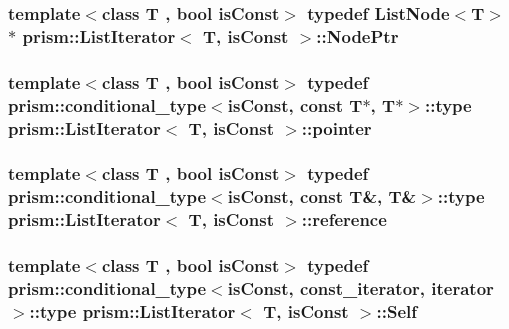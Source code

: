 \subsubsection[{\texorpdfstring{Node\+Ptr}{NodePtr}}]{\setlength{\rightskip}{0pt plus 5cm}template$<$class T , bool is\+Const$>$ typedef {\bf List\+Node}$<$T$>$$\ast$ {\bf prism\+::\+List\+Iterator}$<$ T, is\+Const $>$\+::{\bf Node\+Ptr}}\hypertarget{structprism_1_1_list_iterator_aad2175a44d3db4fd84059ae15158b174}{}\label{structprism_1_1_list_iterator_aad2175a44d3db4fd84059ae15158b174}
\subsubsection[{\texorpdfstring{pointer}{pointer}}]{\setlength{\rightskip}{0pt plus 5cm}template$<$class T , bool is\+Const$>$ typedef {\bf prism\+::conditional\+\_\+type}$<$is\+Const, const T$\ast$, T$\ast$$>$\+::type {\bf prism\+::\+List\+Iterator}$<$ T, is\+Const $>$\+::{\bf pointer}}\hypertarget{structprism_1_1_list_iterator_adb94db3cc26f2df6b6962b756b6fa3c3}{}\label{structprism_1_1_list_iterator_adb94db3cc26f2df6b6962b756b6fa3c3}
\subsubsection[{\texorpdfstring{reference}{reference}}]{\setlength{\rightskip}{0pt plus 5cm}template$<$class T , bool is\+Const$>$ typedef {\bf prism\+::conditional\+\_\+type}$<$is\+Const, const T\&, T\&$>$\+::type {\bf prism\+::\+List\+Iterator}$<$ T, is\+Const $>$\+::{\bf reference}}\hypertarget{structprism_1_1_list_iterator_a8a07c86e6d1ef38b0f7d390ad7c05c22}{}\label{structprism_1_1_list_iterator_a8a07c86e6d1ef38b0f7d390ad7c05c22}
\subsubsection[{\texorpdfstring{Self}{Self}}]{\setlength{\rightskip}{0pt plus 5cm}template$<$class T , bool is\+Const$>$ typedef {\bf prism\+::conditional\+\_\+type}$<$is\+Const, {\bf const\+\_\+iterator}, {\bf iterator}$>$\+::type {\bf prism\+::\+List\+Iterator}$<$ T, is\+Const $>$\+::{\bf Self}}\hypertarget{structprism_1_1_list_iterator_a54dfed5d1937a612aa2ae524b55f8087}{}\label{structprism_1_1_list_iterator_a54dfed5d1937a612aa2ae524b55f8087}
